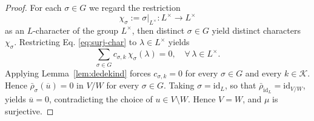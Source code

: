 \documentclass[hidelinks,onefignum,onetabnum]{siamart251216}
\theoremstyle{definition}
\theoremstyle{remark}
\begin{document}
\begin{proof}
For each $\sigma\in G$ we regard the
restriction
\[
\chi_{\sigma}:=\sigma|_{L^{\times}}\colon L^{\times}\longrightarrow L^{\times}
\]
as an $L$-character of the group $L^{\times}$, then distinct $\sigma\in G$ yield distinct characters
$\chi_{\sigma}$. Restricting Eq. \eqref{eq:surj-char} to
$\lambda\in L^{\times}$ yields
\[
\sum_{\sigma\in G}c_{\sigma,k}\,\chi_{\sigma}(\lambda)=0,
\quad \forall\,\lambda\in L^{\times}.
\]
 Applying
Lemma~\ref{lem:dedekind} forces $c_{\sigma,k}=0$ for every
$\sigma\in G$ and every $k\in\mathcal K$. Hence
$\bar\rho_{\sigma}(\overline{u})=0$ in $V/W$ for every $\sigma\in G$. Taking $\sigma=\mathrm{id}_{L}$, so that
$\bar\rho_{\mathrm{id}_{L}}=\mathrm{id}_{V/W}$, yields
$\overline{u}=0$, contradicting the choice of $u\in V\setminus W$.
Hence $V=W$, and $\mu$ is surjective.
	

\end{proof}
\end{document}
